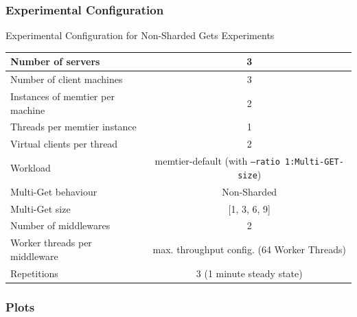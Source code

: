 \documentclass[11pt,a4paper]{article}
\begin{document}
\subsubsection{Experimental Configuration}
\begin{center}
	\scriptsize{
		Experimental Configuration for Non-Sharded Gets Experiments
		\begin{tabular}{|l|c|}
			\hline Number of servers                & 3                       \\ 
			\hline Number of client machines        & 3                       \\ 
			\hline Instances of memtier per machine & 2                       \\ 
			\hline Threads per memtier instance     & 1                       \\
			\hline Virtual clients per thread       & 2                		 \\ 
			\hline Workload                         & memtier-default (with \texttt{--ratio 1:Multi-GET-size})  \\
			\hline Multi-Get behaviour               & Non-Sharded             \\
			\hline Multi-Get size                   & [1, 3, 6, 9]                  \\
			\hline Number of middlewares            & 2                       \\
			\hline Worker threads per middleware    & max. throughput config. (64 Worker Threads) \\
			\hline Repetitions                      & 3 (1 minute steady state)               \\ 
			\hline 
		\end{tabular}
	} 
\end{center}

\subsubsection{Plots}
	
\end{document}
